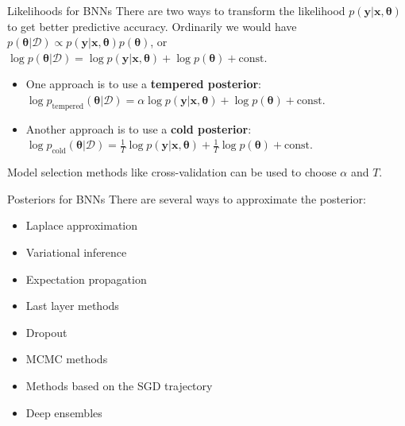 \documentclass{beamer}
\begin{document}
\begin{frame}{Likelihoods for BNNs}
    There are two ways to transform the likelihood $p(\boldsymbol{y} | \boldsymbol{x}, \boldsymbol{\theta})$ to get better predictive accuracy. Ordinarily we would have $p(\boldsymbol{\theta} | \mathcal{D}) \propto p(\boldsymbol{y} | \boldsymbol{x}, \boldsymbol{\theta})p(\boldsymbol{\theta})$, or $\log p(\boldsymbol{\theta} | \mathcal{D}) = \log p(\boldsymbol{y} | \boldsymbol{x}, \boldsymbol{\theta}) + \log p(\boldsymbol{\theta}) + \text{const}$.
    \begin{itemize}
        \item One approach is to use a \textbf{tempered posterior}: $\log p_{\text{tempered}}(\boldsymbol{\theta} | \mathcal{D}) = \alpha\log p(\boldsymbol{y} | \boldsymbol{x}, \boldsymbol{\theta}) + \log p(\boldsymbol{\theta}) + \text{const}$.
        \item Another approach is to use a \textbf{cold posterior}: $\log p_{\text{cold}}(\boldsymbol{\theta} | \mathcal{D}) = \frac{1}{T}\log p(\boldsymbol{y} | \boldsymbol{x}, \boldsymbol{\theta}) + \frac{1}{T}\log p(\boldsymbol{\theta}) + \text{const}$.
    \end{itemize}
    Model selection methods like cross-validation can be used to choose $\alpha$ and $T$.
\end{frame}

\begin{frame}{Posteriors for BNNs}
    There are several ways to approximate the posterior:
    \begin{itemize}
        \item Laplace approximation
        \item Variational inference
        \item Expectation propagation
        \item Last layer methods
        \item Dropout
        \item MCMC methods
        \item Methods based on the SGD trajectory
        \item Deep ensembles
    \end{itemize}
\end{frame}
\end{document}
